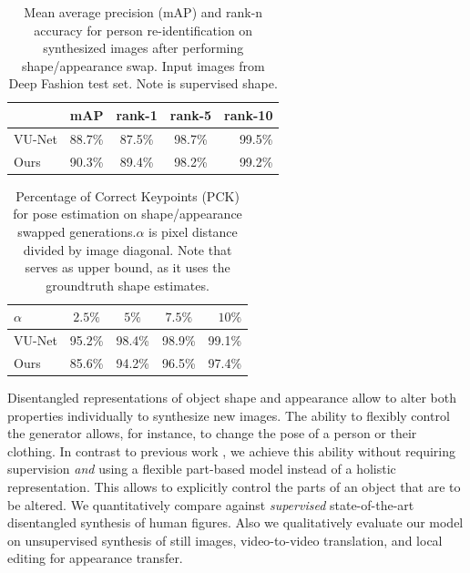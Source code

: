 	\begin{table}
		\centering
		\caption{Mean average precision (mAP) and rank-n accuracy for person re-identification on synthesized images after performing shape/appearance swap. Input images from Deep Fashion test set. Note \cite{esser18} is supervised \wrt shape.}
		\label{tab:reid}
		\begin{tabular}{l|cccr}
			\hline
			& mAP & rank-1 & rank-5 & rank-10 \\ \hline
			VU-Net \cite{esser18} & 88.7\% & 87.5\% & {98.7}\% & {99.5}\% \\
			Ours & {90.3}\% & {89.4}\% &{98.2}\% & {99.2}\% \\ \hline
		\end{tabular}
	\end{table}
	\begin{table}
		\centering
		\caption{Percentage of Correct Keypoints (PCK) for pose estimation on shape/appearance swapped generations.\;$\alpha$ is pixel distance divided by image diagonal. Note that \cite{esser18} serves as upper bound, as it uses the groundtruth shape estimates.}
		\label{tab:pose}
		\begin{tabular}{l|cccr}
			\hline
			$\alpha$ & $2.5\%$ &  $5\%$ & $7.5\%$ & $10\%$ \\ \hline
			VU-Net \cite{esser18} & {95.2}\% & {98.4}\% & {98.9}\% & {99.1}\% \\
			Ours & 85.6\% & 94.2\% &96.5\% & 97.4\% \\ \hline
		\end{tabular}
	\end{table}


	Disentangled representations of object shape and appearance allow to alter both properties individually to synthesize new images. The ability to flexibly control the generator allows, for instance, to change the pose of a person or their clothing. In contrast to previous work \cite{esser18, denton17disvideo, ma17poseguided, ma17disperson, debem18dgpose, jakab18},
	we achieve this ability without requiring supervision \textit{and} using a flexible part-based model instead of a holistic representation. This allows to explicitly control the parts of an object that are to be altered. We quantitatively compare against \emph{supervised} state-of-the-art disentangled synthesis of human figures. Also we qualitatively evaluate our model on unsupervised synthesis of still images, video-to-video translation, and local editing for appearance transfer.


